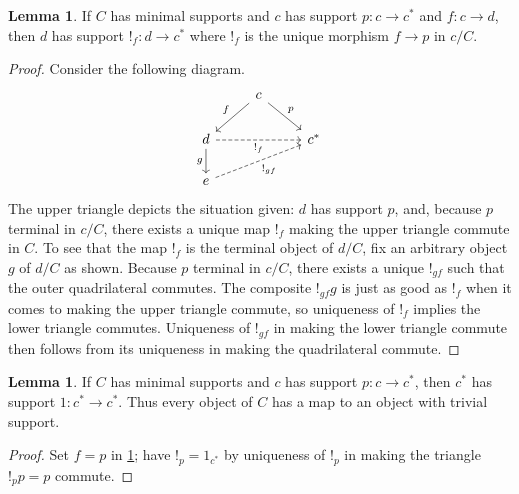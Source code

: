 \documentclass[
  sigconf,
  screen, ]{acmart}
\theoremstyle{definition}
\newtheorem{lemma}[theorem]{Lemma}
\begin{document}
\begin{lemma} \label{app:lem:supported-category-stability}
  If $C$ has minimal supports
  and $c$ has support $p : c \to c^*$
  and $f : c\to d$,
  then $d$ has support $!_f : d\to c^*$
  where $!_f$ is the unique morphism $f\to p$ in $c/C$.
\end{lemma}
\begin{proof}
Consider the following diagram.
\[\begin{tikzcd}
      & c \arrow[ld, "f"'] \arrow[rd, "p"] &                 \\
  d \arrow[d, "g"'] \arrow[rr, "!_f"', dashed] &                                                                
   & c^* \\
  e \arrow[rru, "!_{gf}"', dashed]                        &                                                                  &                
  \end{tikzcd}\]
The upper triangle depicts the situation given: $d$
has support $p$, and,
because $p$ terminal in $c/C$,
there exists a unique map
$!_f$ making the upper triangle commute in $C$.
To see that the map $!_f$ is the terminal object of $d/C$,
fix an arbitrary object $g$ of $d/C$ as shown.
Because $p$ terminal in $c/C$,
there exists a unique $!_{gf}$ such that the outer quadrilateral 
commutes. The composite $!_{gf}g$ is just as
good as $!_f$ when it comes to making the upper triangle commute, so
uniqueness of $!_f$ implies the lower triangle commutes.
Uniqueness of $!_{gf}$ in making the lower triangle commute
then follows from its uniqueness in making the quadrilateral commute.
\end{proof}

\begin{lemma} \label{app:lem:supported-category-support-id}
  If $C$ has minimal supports and $c$ has support $p : c \to c^*$,
  then $c^*$ has support $1 : c^*\to c^*$.
  Thus every object of $C$ has a map to an object
  with trivial support.
\end{lemma}
\begin{proof}
  Set $f = p$ in \cref{app:lem:supported-category-stability};
  have $!_p = 1_{c^*}$ by uniqueness of $!_p$ in making
  the triangle $!_p p = p$ commute.
\end{proof}
\end{document}
